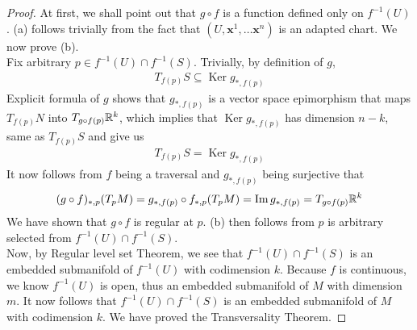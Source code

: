 \documentclass{report}
\begin{document}
\begin{proof}
At first, we shall point out that $g\circ f$ is a function defined only on  $f^{-1}(U)$. (a) follows trivially from the fact that $(U,\textbf{x}^1,\dots \textbf{x}^n)$ is an adapted chart.  We now prove (b). \\


Fix arbitrary $p \in f^{-1}(U)\cap f^{-1}(S)$. Trivially, by definition of $g$, 
\begin{align*}
T_{f(p)}S \subseteq \operatorname{Ker}g_{*,f(p)}
\end{align*}
Explicit formula of $g$ shows that $g_{*,f(p)}$ is a vector space epimorphism that maps $T_{f(p)}N$ into $T_{g\circ f(p)}\mathbb{R}^k$, which implies that $\operatorname{Ker}g_{*,f(p)}$ has dimension $n-k$, same as $T_{f(p)}S$ and give us 
\begin{align*}
T_{f(p)}S = \operatorname{Ker}g_{*,f(p)}
\end{align*}
It now follows from  $f$ being a traversal and $g_{*,f(p)}$ being surjective that 
 \begin{align*}
   (g\circ f)_{*,p}(T_pM)=g_{*,f(p)}\circ f_{*,p}(T_pM)=\operatorname{Im}g_{*,f(p)}=T_{g\circ f(p)}\mathbb{R}^k
\end{align*}
We have shown that $g\circ f$ is regular at $p$. (b) then follows from $p$ is arbitrary selected from  $f^{-1}(U)\cap f^{-1}(S)$. \\

Now, by Regular level set Theorem, we see that $f^{-1}(U)\cap f^{-1}(S)$ is an embedded submanifold of $f^{-1}(U)$ with codimension $k$. Because $f$ is continuous, we know  $f^{-1}(U)$ is open, thus an embedded submanifold of $M$ with dimension $m$. It now follows that  $f^{-1}(U)\cap f^{-1}(S)$ is an embedded submanifold of $M$ with codimension  $k$. We have proved the Transversality Theorem. 
\end{proof}
\end{document}
